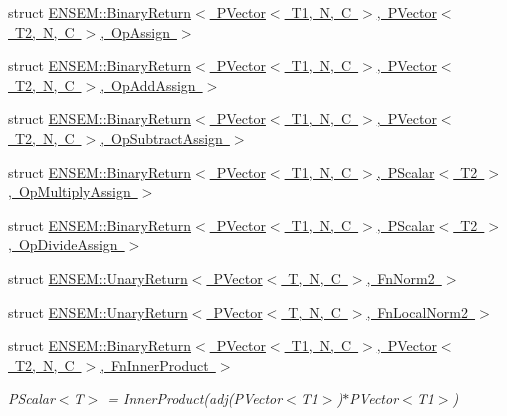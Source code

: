 \begin{DoxyCompactItemize}
\item 
struct \mbox{\hyperlink{structENSEM_1_1BinaryReturn_3_01PVector_3_01T1_00_01N_00_01C_01_4_00_01PVector_3_01T2_00_01N_00_01C_01_4_00_01OpAssign_01_4}{E\+N\+S\+E\+M\+::\+Binary\+Return$<$ P\+Vector$<$ T1, N, C $>$, P\+Vector$<$ T2, N, C $>$, Op\+Assign $>$}}
\item 
struct \mbox{\hyperlink{structENSEM_1_1BinaryReturn_3_01PVector_3_01T1_00_01N_00_01C_01_4_00_01PVector_3_01T2_00_01N_00_01C_01_4_00_01OpAddAssign_01_4}{E\+N\+S\+E\+M\+::\+Binary\+Return$<$ P\+Vector$<$ T1, N, C $>$, P\+Vector$<$ T2, N, C $>$, Op\+Add\+Assign $>$}}
\item 
struct \mbox{\hyperlink{structENSEM_1_1BinaryReturn_3_01PVector_3_01T1_00_01N_00_01C_01_4_00_01PVector_3_01T2_00_01N_00_691f1a9a29e289a86129e83b337c7d0f}{E\+N\+S\+E\+M\+::\+Binary\+Return$<$ P\+Vector$<$ T1, N, C $>$, P\+Vector$<$ T2, N, C $>$, Op\+Subtract\+Assign $>$}}
\item 
struct \mbox{\hyperlink{structENSEM_1_1BinaryReturn_3_01PVector_3_01T1_00_01N_00_01C_01_4_00_01PScalar_3_01T2_01_4_00_01OpMultiplyAssign_01_4}{E\+N\+S\+E\+M\+::\+Binary\+Return$<$ P\+Vector$<$ T1, N, C $>$, P\+Scalar$<$ T2 $>$, Op\+Multiply\+Assign $>$}}
\item 
struct \mbox{\hyperlink{structENSEM_1_1BinaryReturn_3_01PVector_3_01T1_00_01N_00_01C_01_4_00_01PScalar_3_01T2_01_4_00_01OpDivideAssign_01_4}{E\+N\+S\+E\+M\+::\+Binary\+Return$<$ P\+Vector$<$ T1, N, C $>$, P\+Scalar$<$ T2 $>$, Op\+Divide\+Assign $>$}}
\item 
struct \mbox{\hyperlink{structENSEM_1_1UnaryReturn_3_01PVector_3_01T_00_01N_00_01C_01_4_00_01FnNorm2_01_4}{E\+N\+S\+E\+M\+::\+Unary\+Return$<$ P\+Vector$<$ T, N, C $>$, Fn\+Norm2 $>$}}
\item 
struct \mbox{\hyperlink{structENSEM_1_1UnaryReturn_3_01PVector_3_01T_00_01N_00_01C_01_4_00_01FnLocalNorm2_01_4}{E\+N\+S\+E\+M\+::\+Unary\+Return$<$ P\+Vector$<$ T, N, C $>$, Fn\+Local\+Norm2 $>$}}
\item 
struct \mbox{\hyperlink{structENSEM_1_1BinaryReturn_3_01PVector_3_01T1_00_01N_00_01C_01_4_00_01PVector_3_01T2_00_01N_00_a7cabe4dbe0fdb804ad141abb1024477}{E\+N\+S\+E\+M\+::\+Binary\+Return$<$ P\+Vector$<$ T1, N, C $>$, P\+Vector$<$ T2, N, C $>$, Fn\+Inner\+Product $>$}}
\begin{DoxyCompactList}\small\item\em P\+Scalar$<$\+T$>$ = Inner\+Product(adj(\+P\+Vector$<$\+T1$>$)$\ast$\+P\+Vector$<$\+T1$>$) \end{DoxyCompactList}\item 

\end{DoxyCompactItemize}
